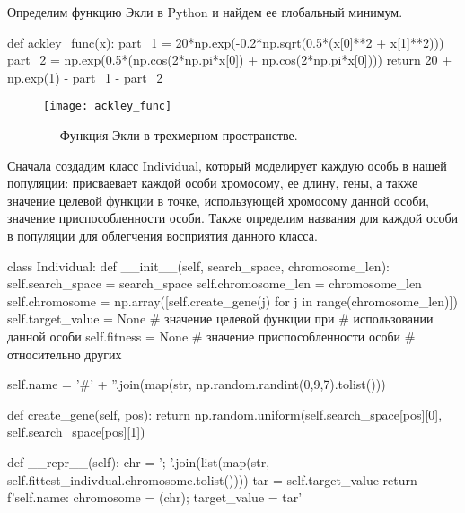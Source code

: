 Определим функцию Экли в Python и найдем ее глобальный минимум.
\begin{pyin}
def ackley_func(x):
   part_1 = 20*np.exp(-0.2*np.sqrt(0.5*(x[0]**2 + x[1]**2)))
   part_2 = np.exp(0.5*(np.cos(2*np.pi*x[0]) + np.cos(2*np.pi*x[0])))
   return 20 + np.exp(1) - part_1 - part_2
\end{pyin}

\begin{figure}[ht!]
 \centering
	\texttt{[image: ackley\_func]}
	\caption{ --- Функция Экли в трехмерном пространстве.}
	\label{img:ackley_func}
\end{figure}


Сначала создадим класс Individual, который моделирует каждую особь в нашей популяции: присваевает каждой особи хромосому, ее длину, гены, а также значение целевой функции в точке, использующей хромосому данной особи, значение приспособленности особи. Также определим названия для каждой особи в популяции для облегчения восприятия данного класса.
\begin{pyin}
class Individual:
  def __init__(self, search_space, chromosome_len):
    self.search_space = search_space
    self.chromosome_len = chromosome_len
    self.chromosome = np.array([self.create_gene(j)
                                for j in range(chromosome_len)])
    self.target_value = None # значение целевой функции при
    # использовании данной особи
    self.fitness = None # значение приспособленности особи
    # относительно других
\end{pyin}
\begin{pyprint}
    self.name = '#' + ''.join(map(str,
                                  np.random.randint(0,9,7).tolist()))

  def create_gene(self, pos):
    return np.random.uniform(self.search_space[pos][0],
                             self.search_space[pos][1])

\end{pyprint}
\vspace{-10pt}
\begin{pyprint}
  def __repr__(self):
	  chr = '; '.join(list(map(str,
                    self.fittest_indivdual.chromosome.tolist())))
    tar = self.target_value
    return f'{self.name}: chromosome = {(chr)}; target_value = {tar}'
\end{pyprint}

